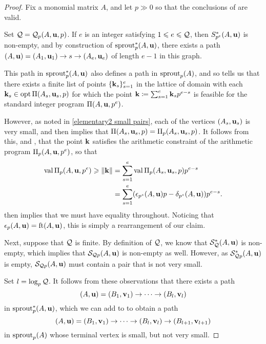 \documentclass[11pt]{amsart}
\renewcommand{\S}{\mathcal{S}}
\begin{document}
\begin{proof}
Fix a monomial matrix $A$, and let $p \gg 0$ so that the conclusions of  are valid.

Set $\mathcal{Q} = \mathcal{Q}_p(A,\mathbf{u},p)$.  If $e$ is an integer satisfying $1 \leqslant e \leqslant \mathcal{Q}$, then $S_{p^e}^{\ast}(A,\mathbf{u})$ is non-empty, and by construction of $\operatorname{sprout}_p^{\ast}(A,\mathbf{u})$, there exists a path $(A,\mathbf{u}) = (A_1, \mathbf{u}_1) \to s \to (A_e, \mathbf{u}_e)$ of length $e-1$ in this graph.

This path in $\operatorname{sprout}_p^{\ast}(A,\mathbf{u})$ also defines a path in $\operatorname{sprout}_p(A)$, and so   tells us that there exists a finite list of points $\{ \mathbf{k}_s \}_{s=1}^e$ in the lattice of domain with each $\mathbf{k}_s \in \operatorname{opt} \Pi(A_s, \mathbf{u}_s, p)$ for which the point $\mathbf{k} \coloneqq \sum_{s=1}^e \mathbf{k}_s p^{e-s}$ is feasible for the standard integer program $\Pi(A, \mathbf{u}, p^e)$.  

However, as noted in \eqref{elementary2 small pairs}, each of the vertices $(A_s, \mathbf{u}_s)$ is very small, and   then implies that $\Pi(A_s,\mathbf{u}_s,p) = \Pi_p(A_s, \mathbf{u}_s, p)$.  It follows from this, and , that the point $\mathbf{k}$ satisfies the arithmetic constraint of the arithmetic program $\Pi_p(A,\mathbf{u},p^e)$, so that 
%
\begin{align*} 
\operatorname{val} \Pi_p(A,\mathbf{u},p^e) \geqslant  \| \mathbf{k} \| & = \sum_{s=1}^e \operatorname{val} \Pi_p(A_s,\mathbf{u}_s,p) p^{e-s} \\
& = \sum_{s=1}^e (\epsilon_{p^s}(A,\mathbf{u})p - \delta_{p^s}(A,\mathbf{u})) p^{e-s}.
\end{align*}
 then implies that we must have equality throughout.  Noticing that $\epsilon_p(A,\mathbf{u}) = \operatorname{ft}(A, \mathbf{u})$, this is simply a rearrangement of our claim.

Next, suppose that $\mathcal{Q}$ is finite.  By definition of $\mathcal{Q}$, we know that $\S_{\Q}^{\ast}(A,\vv{u})$ is non-empty, which implies that $\S_{\Q p}(A,\vv{u})$ is non-empty as well.  However, as $\S^{\ast}_{\Q p}(A,\vv{u})$ is empty, $\S_{\Q p}(A,\vv{u})$ must contain a pair that is not very small.

Set $l=\log_p \mathcal{Q}$.   It follows from these observations that there exists a path \[ (A,\mathbf{u}) = (B_1,\mathbf{v}_1) \to \cdots \to (B_{l}, \mathbf{v}_{l}) \] 
in $\operatorname{sprout}_p^{\ast}(A,\mathbf{u})$, which we can add to to obtain a path 
\[ (A,\mathbf{u}) = (B_1,\mathbf{v}_1) \to \cdots \to (B_{l}, \mathbf{v}_{l}) \to (B_{l+1}, \mathbf{v}_{l+1}) \]
in $\operatorname{sprout}_p(A)$ whose terminal vertex is small, but not very small.
 

\end{proof}
\end{document}

